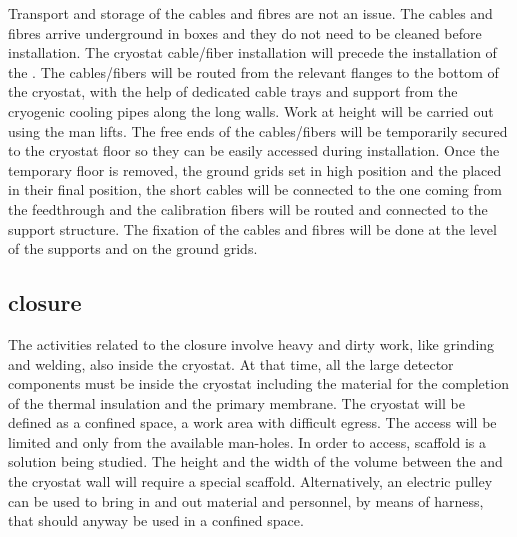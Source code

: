 Transport and storage of the cables and fibres are not an issue.
The cables and fibres arrive underground in boxes and they do not need to be cleaned before installation.
The cryostat cable/fiber installation will precede the installation of the .
The cables/fibers will be routed from the relevant flanges to the bottom of the cryostat, with the help of dedicated cable trays and support from the cryogenic cooling pipes along the long walls.
Work at height will be carried out using the man lifts.
The free ends of the cables/fibers will be temporarily secured to the cryostat floor so they can be easily accessed during installation.
Once the temporary floor is removed, the ground grids set in high position and the  placed in their final position, the short  cables will be connected to the one coming from the feedthrough and the calibration fibers will be routed and connected to the support structure.
The fixation of the cables and fibres will be done at the level of the  supports and on the ground grids.

\subsection{ closure}
The activities related to the  closure involve heavy and dirty work, like grinding and welding, also inside the cryostat.
At that time, all the large detector components must be inside the cryostat including the material for the completion of the thermal insulation and the primary membrane.
The cryostat will be defined as a confined space, a work area with difficult egress.
The access will be limited and only from the available man-holes.
In order to access, scaffold is a solution being studied.
The height and the width of the volume between the  and the cryostat wall will require a special scaffold.
Alternatively, an electric pulley can be used to bring in and out material and personnel, by means of harness, that should anyway be used in a confined space.

